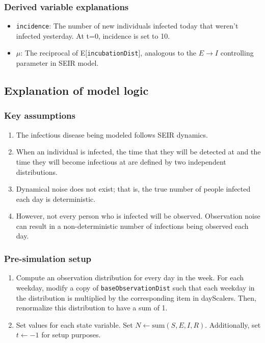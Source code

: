 \documentclass{article}
\newcommand{\code}[1]{\texttt{#1}}
\begin{document}
\subsubsection{Derived variable explanations}
\begin{itemize}
    \item \code{incidence}: The number of new individuals infected today that weren't infected yesterday. At t=0, incidence is set to 10.
    \item $\mu$: The reciprocal of E[\code{incubationDist}], analogous to the $E \rightarrow I$ controlling parameter in SEIR model.
\end{itemize}

\subsection{Explanation of model logic}

\subsubsection{Key assumptions}

\begin{enumerate}
	\item The infectious disease being modeled follows SEIR dynamics.
	\item When an individual is infected, the time that they will be detected at and the time they will become infectious at are defined by two independent distributions.
	\item Dynamical noise does not exist; that is, the true number of people infected each day is deterministic.  
	\item However, not every person who is infected will be observed. Observation noise can result in a non-deterministic number of infections being observed each day. 

\end{enumerate}

\subsubsection{Pre-simulation setup}

\begin{enumerate}
    \item Compute an observation distribution for every day in the week. For each weekday, modify a copy of \code{baseObservationDist} such that each weekday in the distribution is multiplied by the corresponding item in dayScalers. Then, renormalize this distribution to have a sum of 1.
    
    \item Set values for each state variable. Set $N \gets \mathrm{sum}(S, E, I, R)$. Additionally, set $t \gets -1$ for setup purposes.

\end{enumerate}
\end{document}
